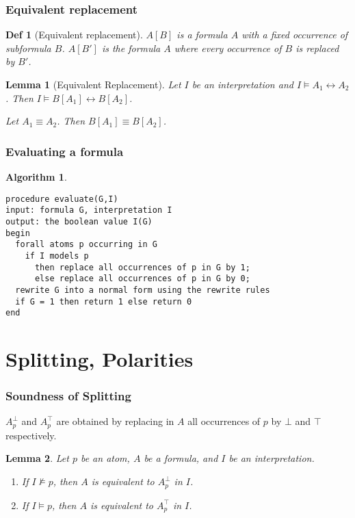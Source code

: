 \documentclass[]{article}
\newtheorem{lemma}{Lemma}
\newtheorem*{definition*}{Def}
\newtheorem{algorithm}{Algorithm}
\begin{document}
\subsubsection{Equivalent replacement}
\begin{definition*}[Equivalent replacement]
	$A[B]$ is a formula $A$ with a fixed occurrence of subformula $B$. $A[B']$ is the formula $A$ where every occurrence of $B$ is replaced by $B'$.
\end{definition*}

\begin{lemma}[Equivalent Replacement]
	Let $I$ be an interpretation and $I \models A_1 \leftrightarrow A_2$. Then $I \models B[A_1] \leftrightarrow B[A_2]$.
	
	Let $A_1 \equiv A_2$. Then $B[A_1] \equiv B[A_2]$.
\end{lemma}


\subsubsection{Evaluating a formula}
\begin{algorithm}
\begin{verbatim}
procedure evaluate(G,I)
input: formula G, interpretation I
output: the boolean value I(G)
begin
  forall atoms p occurring in G
    if I models p
      then replace all occurrences of p in G by 1;
      else replace all occurrences of p in G by 0;
  rewrite G into a normal form using the rewrite rules
  if G = 1 then return 1 else return 0
end
\end{verbatim}
\end{algorithm}

\section{Splitting, Polarities}

\subsubsection{Soundness of Splitting}

$A_p^\bot$ and $A_p^\top$ are obtained by replacing in $A$ all occurrences of $p$ by $\bot$ and $\top$ respectively.

\begin{lemma}
	Let $p$ be an atom, $A$ be a formula, and $I$ be an interpretation.
	
	\begin{enumerate}
		\item If $I \not\models p$, then $A$ is equivalent to $A_p^\bot$ in $I$.
		\item If $I \models p$, then $A$ is equivalent to $A_p^\top$ in $I$.
	\end{enumerate}
\end{lemma}
\end{document}
